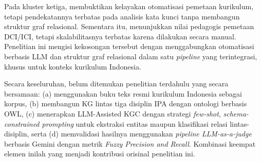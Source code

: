 \documentclass[main]{subfiles}
\begin{document}
Pada kluster ketiga, \textcite{said_mapping_2024} membuktikan kelayakan
otomatisasi pemetaan kurikulum, tetapi pendekatannya terbatas pada analisis
kata kunci tanpa membangun struktur graf relasional. Sementara itu,
\textcite{semilarski_expanding_2022} menunjukkan nilai pedagogis pemetaan
DCI/ICI, tetapi skalabilitasnya terbatas karena dilakukan secara manual.
Penelitian ini mengisi kekosongan tersebut dengan menggabungkan otomatisasi
berbasis LLM dan struktur graf relasional dalam satu \textit{pipeline} yang
terintegrasi, khusus untuk konteks kurikulum Indonesia.

Secara keseluruhan, belum ditemukan penelitian terdahulu yang secara
bersamaan: (a) menggunakan buku teks resmi kurikulum Indonesia sebagai
korpus, (b) membangun KG lintas tiga disiplin IPA dengan ontologi
berbasis OWL, (c) menerapkan LLM-Assisted KGC dengan strategi
\textit{few-shot}, \textit{schema-constrained prompting} untuk ekstraksi
entitas maupun klasifikasi relasi lintas-disiplin, serta (d)
memvalidasi hasilnya menggunakan \textit{pipeline LLM-as-a-judge} berbasis Gemini
dengan metrik \textit{Fuzzy Precision and Recall}. Kombinasi keempat elemen
inilah yang menjadi kontribusi orisinal penelitian ini.

\ifSubfilesClassLoaded{\printbibliography[title={Daftar Pustaka}]}{}
\end{document}

